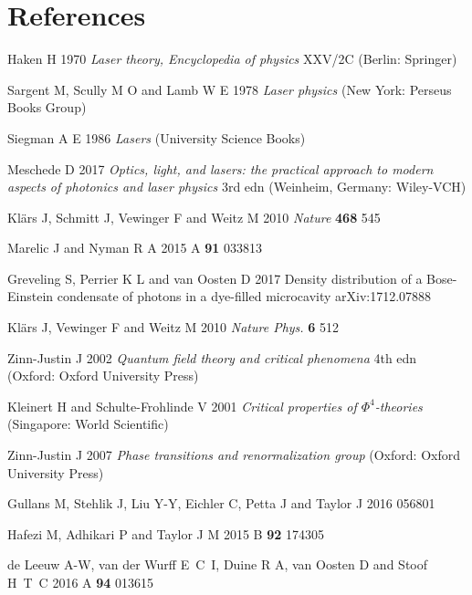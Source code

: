 \documentclass[12pt, a4paper]{iopart}
\begin{document}
\section*{References}
\begin{thebibliography}{84}

Haken H 1970 {\it Laser theory, Encyclopedia of physics} XXV/2C (Berlin: Springer)

Sargent M, Scully M O and Lamb W E 1978 {\it Laser physics} (New York: Perseus Books Group)

Siegman A E 1986 {\it Lasers} (University Science Books)

Meschede D 2017
{\it Optics, light, and lasers: the practical approach to modern aspects of photonics and laser physics} 3rd edn (Weinheim, Germany: Wiley-VCH)

Kl\"ars J, Schmitt J, Vewinger F and Weitz M 2010 {\it Nature} {\bf 468} 545

Marelic J and Nyman R A 2015 \PR A {\bf 91} 033813

Greveling S, Perrier K L and van Oosten D 2017 Density distribution of a Bose-Einstein condensate of photons in a dye-filled microcavity
arXiv:1712.07888

Kl\"ars J, Vewinger F and Weitz M 2010 {\it Nature Phys.} {\bf 6} 512

Zinn-Justin J 2002 {\it Quantum field theory and critical phenomena} 4th edn (Oxford: Oxford University Press)

Kleinert H and Schulte-Frohlinde V 2001 {\it Critical properties of $\Phi^4$-theories} (Singapore: World Scientific)

Zinn-Justin J 2007 {\it Phase transitions and renormalization group} (Oxford: Oxford University Press)

Gullans M, Stehlik J, Liu Y-Y, Eichler C, Petta J and Taylor J 2016  056801

Hafezi M, Adhikari P and Taylor J M 2015 \PR B {\bf 92} 174305

de Leeuw A-W, van der Wurff E~C~I, Duine R A, van Oosten D and Stoof H~T~C 2016 \PR A {\bf 94} 013615


\end{thebibliography}
\end{document}
